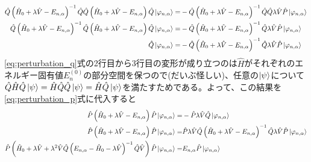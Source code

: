 \documentclass{ltjsarticle}
\begin{document}
\begin{align}
  \hat{Q}\left( \hat{H}_0+\lambda \hat{V}-E_{n,\alpha} \right)^{-1}\hat{Q}\hat{Q}\left( \hat{H}_0+\lambda\hat{V}-E_{n,\alpha} \right)\hat{Q}\ket*{\varphi_{n,\alpha}}=&-\hat{Q}\left( \hat{H}_0+\lambda \hat{V}-E_{n,\alpha} \right)^{-1}\hat{Q}\hat{Q}\lambda\hat{V}\hat{P}\ket*{\varphi_{n,\alpha}}\\
  \hat{Q}\left( \hat{H}_0+\lambda \hat{V}-E_{n,\alpha} \right)^{-1}\hat{Q}\left( \hat{H}_0+\lambda\hat{V}-E_{n,\alpha} \right)\hat{Q}\ket*{\varphi_{n,\alpha}}=&-\hat{Q}\left( \hat{H}_0+\lambda \hat{V}-E_{n,\alpha} \right)^{-1}\hat{Q}\lambda\hat{V}\hat{P}\ket*{\varphi_{n,\alpha}}\\
  \hat{Q}\ket*{\varphi_{n,\alpha}}=&-\hat{Q}\left( \hat{H}_0+\lambda \hat{V}-E_{n,\alpha} \right)^{-1}\hat{Q}\lambda\hat{V}\hat{P}\ket*{\varphi_{n,\alpha}}
  \label{eq:perturbation_q}
\end{align}
\eqref{eq:perturbation_q}式の2行目から3行目の変形が成り立つのは$\hat{H}$がそれぞれのエネルギー固有値$E_n^{(0)}$の部分空間を保つので(だいぶ怪しい)、任意の$\ket{\psi}$について$\hat{Q}\hat{H}\hat{Q}\ket{\psi}=\hat{H}\hat{Q}\hat{Q}\ket{\psi}=\hat{H}\hat{Q}\ket{\psi}$を満たすためである。よって、この結果を\eqref{eq:perturbation_p}式に代入すると
\begin{align}
  \hat{P}\left( \hat{H}_0+\lambda\hat{V}-E_{n,\alpha} \right)\hat{P}\ket*{\varphi_{n,\alpha}}=&-\hat{P}\lambda\hat{V}\hat{Q}\ket*{\varphi_{n,\alpha}}\\
  \hat{P}\left( \hat{H}_0+\lambda\hat{V}-E_{n,\alpha} \right)\hat{P}\ket*{\varphi_{n,\alpha}}=&\hat{P}\lambda\hat{V}\hat{Q}\left( \hat{H}_0+\lambda \hat{V}-E_{n,\alpha} \right)^{-1}\hat{Q}\lambda\hat{V}\hat{P}\ket*{\varphi_{n,\alpha}}\\
  \hat{P}\left( \hat{H}_0+\lambda\hat{V}+\lambda^2\hat{V}\hat{Q}\left( E_{n,\alpha}-\hat{H}_0-\lambda \hat{V} \right)^{-1}\hat{Q}\hat{V} \right)\hat{P}\ket*{\varphi_{n,\alpha}}=&E_{n,\alpha}\hat{P}\ket*{\varphi_{n,\alpha}}
  \label{eq:perturbation_result}
\end{align}
\end{document}
